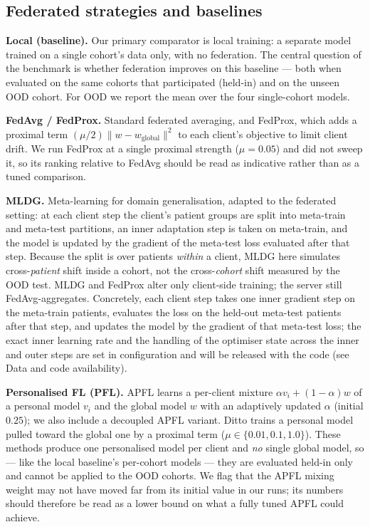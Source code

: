 \documentclass[10pt,letterpaper]{article}
\begin{document}
\subsection*{Federated strategies and baselines}

\textbf{Local (baseline).} Our primary comparator is local training: a separate
model trained on a single cohort's data only, with no federation. The central
question of the benchmark is whether federation improves on this baseline ---
both when evaluated on the same cohorts that participated (held-in) and on the
unseen OOD cohort. For OOD we report the mean over the four single-cohort models.

\textbf{FedAvg / FedProx.} Standard federated averaging, and FedProx, which adds
a proximal term $(\mu/2)\lVert w - w_{\text{global}}\rVert^2$ to each client's
objective to limit client drift. We run FedProx at a single proximal strength
($\mu=0.05$) and did not sweep it, so its ranking relative to FedAvg should be
read as indicative rather than as a tuned comparison.

\textbf{MLDG.} Meta-learning for domain generalisation, adapted to the federated
setting: at each client step the client's patient groups are split into
meta-train and meta-test partitions, an inner adaptation step is taken on
meta-train, and the model is updated by the gradient of the meta-test loss
evaluated after that step. Because the split is over patients \emph{within} a
client, MLDG here simulates cross-\emph{patient} shift inside a cohort, not the
cross-\emph{cohort} shift measured by the OOD test. MLDG and FedProx alter only
client-side training; the server still FedAvg-aggregates. Concretely, each client
step takes one inner gradient step on the meta-train patients, evaluates the loss
on the held-out meta-test patients after that step, and updates the model by the
gradient of that meta-test loss; the exact inner learning rate and the handling
of the optimiser state across the inner and outer steps are set in configuration
and will be released with the code (see Data and code availability).

\textbf{Personalised FL (PFL).} APFL learns a per-client mixture
$\alpha v_i + (1-\alpha)w$ of a personal model $v_i$ and the global model $w$
with an adaptively updated $\alpha$ (initial $0.25$); we also include a decoupled
APFL variant. Ditto trains a personal model pulled toward the global one by a
proximal term ($\mu\in\{0.01,0.1,1.0\}$). These methods produce one personalised
model per client and \emph{no} single global model, so --- like the local
baseline's per-cohort models --- they are evaluated held-in only and cannot be
applied to the OOD cohorts. We flag that the APFL mixing weight may not have moved
far from its initial value in our runs; its numbers should therefore be read as a
lower bound on what a fully tuned APFL could achieve.
\end{document}
